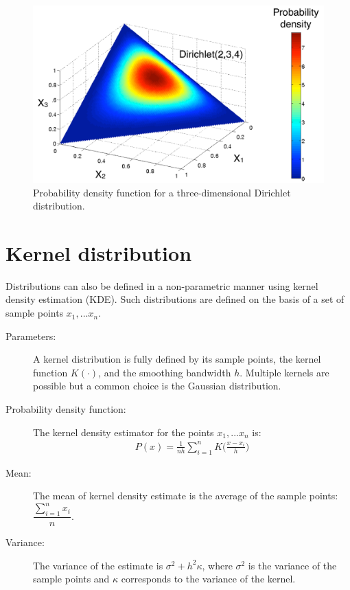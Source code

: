 \begin{figure}[h!]
\centering
\includegraphics[scale=0.40]{imgs/dirichlet_appendix.pdf}
\caption{Probability density function for a three-dimensional Dirichlet distribution.} 
\label{fig:norm-appendix}
\end{figure}


\section*{Kernel distribution}

Distributions can also be defined in a non-parametric manner using kernel density estimation (KDE).  Such distributions are defined on the basis of a set of sample points $x_1,...x_n$.

\begin{description}
\item [Parameters: ] A kernel distribution is fully defined by its sample points, the kernel function $K(\cdot)$, and the smoothing bandwidth $h$.  Multiple kernels are possible but a common choice is the Gaussian distribution.

\item [Probability density function: ] The kernel density estimator for the points $x_1,...x_n$ is: 
\begin{align}
P(x) = \frac{1}{nh} \sum_{i=1}^n K\Big(\frac{x-x_i}{h}\Big)
\end{align}
\item [Mean: ] The mean of kernel density estimate is the average of the sample points: $\dfrac{\sum_{i=1}^n x_i}{n}$.

\item [Variance: ] The variance of the estimate is $\sigma^2 + h^2 \kappa$, where $\sigma^2$ is the variance of the sample points and $\kappa$ corresponds to the variance of the kernel. 

\end{description}

